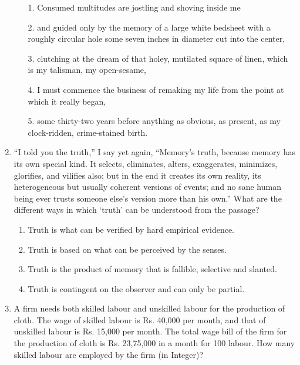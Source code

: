 \documentclass[12pt]{article}
\theoremstyle{remark}
\begin{document}
\begin{enumerate}
\begin{enumerate} 
\item[1.] Consumed multitudes are jostling and shoving inside me
\item[2.] and guided only by the memory of a large white bedsheet with a roughly circular hole some seven inches in diameter cut into the center,
\item[3.] clutching at the dream of that holey, mutilated square of linen, which is my talisman, my open-sesame, 
\item[4.] I must commence the business of remaking my life from the point at which it really began,
\item[5.] some thirty-two years before anything as obvious, as present, as my clock-ridden, crime-stained birth.
\end{enumerate}
\begin{enumerate}  \end{enumerate}
\hfill{}
\item “I told you the truth,” I say yet again, “Memory’s truth, because memory has its own special kind. It selects, eliminates, alters, exaggerates, minimizes, glorifies, and vilifies also; but in the end it creates its own reality, its heterogeneous but usually coherent versions of events; and no sane human being ever trusts someone else’s version more than his own.” What are the different ways in which ‘truth’ can be understood from the passage?
\begin{enumerate} 
\item Truth is what can be verified by hard empirical evidence. 
\item Truth is based on what can be perceived by the senses. 
\item Truth is the product of memory that is fallible, selective and slanted. 
\item Truth is contingent on the observer and can only be partial. 
\end{enumerate}
\hfill{}
\item A firm needs both skilled labour and unskilled labour for the production of cloth. The wage of skilled labour is Rs. 40,000 per month, and that of unskilled labour is Rs. 15,000 per month. The total wage bill of the firm for the production of cloth is Rs. 23,75,000 in a month for 100 labour. How many skilled labour are employed by the firm (in Integer)? 

\end{enumerate}
\end{document}
